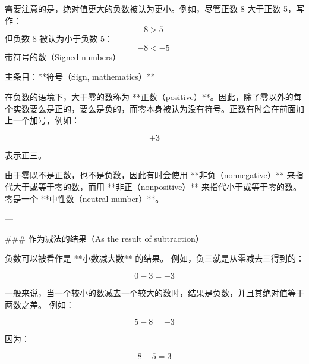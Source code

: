 需要注意的是，绝对值更大的负数被认为更小。例如，尽管正数 8 大于正数 5，写作：
$$
8 > 5~
$$
但负数 8 被认为小于负数 5：
$$
-8 < -5~
$$
带符号的数（Signed numbers）

主条目：**符号（Sign, mathematics）**

在负数的语境下，大于零的数称为 **正数（positive）**。因此，除了零以外的每个实数要么是正的，要么是负的，而零本身被认为没有符号。正数有时会在前面加上一个加号，例如：

$$
+3
$$

表示正三。

由于零既不是正数，也不是负数，因此有时会使用 **非负（nonnegative）** 来指代大于或等于零的数，而用 **非正（nonpositive）** 来指代小于或等于零的数。零是一个 **中性数（neutral number）**。

---

### 作为减法的结果（As the result of subtraction）

负数可以被看作是 **小数减大数** 的结果。
例如，负三就是从零减去三得到的：

$$
0 - 3 = -3
$$

一般来说，当一个较小的数减去一个较大的数时，结果是负数，并且其绝对值等于两数之差。
例如：

$$
5 - 8 = -3
$$

因为：

$$
8 - 5 = 3
$$
